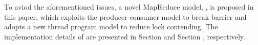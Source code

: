 To aviod the aforementioned issues, a novel MapReduce model, \myds,  is proposed in this paper,
which exploits the producer-consumer model to break barrier and adopts a new thread program model to reduce lock contending.
The implementation details of \myds are presented in Section \label{sec:design} and Section \label{sec:runtime}, respectively.  








